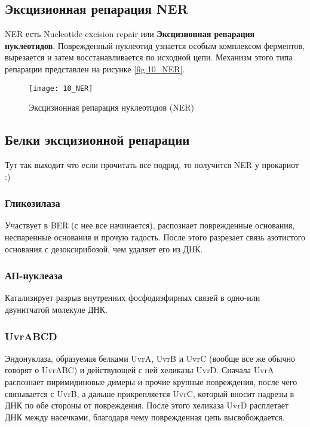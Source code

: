 \subsection{Эксцизионная репарация NER}

NER есть Nucleotide excision repair или \textbf{Эксцизионная репарация нуклеотидов}. Поврежденный нуклеотид узнается особым комплексом ферментов, вырезается и затем восстанавливается по исходной цепи. Механизм этого типа репарации представлен на рисунке \ref{fig:10_NER}.

\begin{figure}[H]
	\centering
	\texttt{[image: 10\_NER]}
	\caption{Эксцизионная репарация нуклеотидов (NER)}
	\label{fig:10_BER}
\end{figure}

\subsection{Белки эксцизионной репарации}

Тут так выходит что если прочитать все подряд, то получится NER у прокариот :)

\subsubsection{Гликозилаза}

Участвует в BER (с нее все начинается), распознает поврежденные основания, неспаренные основания и прочую гадость. После этого разрезает связь азотистого основания с дезоксирибозой, чем удаляет его из ДНК.

\subsubsection{АП-нуклеаза}

Катализирует разрыв внутренних фосфодиэфирных связей в одно-или двунитчатой молекуле ДНК.

\subsubsection{UvrABCD}

Эндонуклаза, образуемая белками UvrA, UvrB и UvrC (вообще все же обычно говорят о UvrABC) и действующей с ней хеликазы UvrD. Сначала UvrA распознает пиримидиновые димеры и прочие крупные повреждения, после чего связывается с UvrB, а дальше прикрепляется UvrC, который вносит надрезы в ДНК по обе стороны от повреждения. После этого хеликаза UvrD расплетает ДНК между насечками, благодаря чему поврежденная цепь высвобождается.


